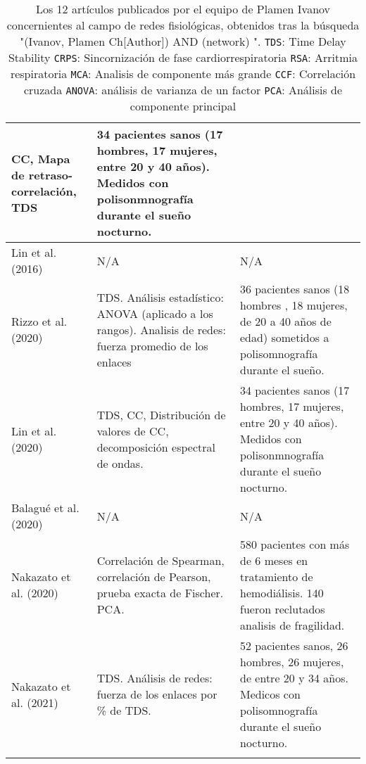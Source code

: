 \documentclass[twoside,twocolumn]{article}
\begin{document}
\begin{center}
\begin{longtable}{|p{}p{}p{}|}
    CC,
    Mapa de retraso-correlación, TDS
    &
    34 pacientes sanos (17 hombres, 17 mujeres, entre 20 y 40 años). Medidos con polisonmnografía durante el sueño nocturno.
    \\ \hline
    Lin et al. (2016)\cite{ivanov2016focus} &
    N/A
    &
    N/A
    \\ \hline
    Rizzo et al. (2020)\cite{rizzo2020network} &
    TDS.
    Análisis estadístico: ANOVA (aplicado a los rangos).
    Analisis de redes: fuerza promedio de los enlaces
    &
    36 pacientes sanos (18 hombres , 18 mujeres, de 20 a 40 años de edad) sometidos a polisomnografía durante el sueño.
    \\ \hline
    Lin et al. (2020)\cite{lin2020dynamic} &
    TDS, CC, Distribución de valores de CC, decomposición espectral de ondas.
    &
    34 pacientes sanos (17 hombres, 17 mujeres, entre 20 y 40 años). Medidos con polisonmnografía durante el sueño nocturno.
    \\ \hline
    Balagué et al. (2020)\cite{balague2020network} &
    N/A
    &
    N/A
    \\ \hline
    Nakazato et al. (2020)\cite{nakazato2020estimation} &
    Correlación de Spearman, correlación de Pearson, prueba exacta de Fischer.
    PCA.
    &
    580 pacientes con más de 6 meses en tratamiento de hemodiálisis. 140 fueron reclutados analisis de fragilidad.
    \\ \hline
    Nakazato et al. (2021)\cite{ivanov2021signal} &
    TDS.
    Análisis de redes: fuerza de los enlaces por \% de TDS.
    &
    52 pacientes sanos, 26 hombres, 26 mujeres, de entre 20 y 34 años. Medicos con polisomnografía durante el sueño nocturno.
    \\ \hline
    \caption{Los 12 artículos publicados por el equipo de Plamen Ivanov concernientes al campo de redes fisiológicas, obtenidos tras la búsqueda "(Ivanov, Plamen Ch[Author]) AND (network) ".
    \texttt{TDS}: Time Delay Stability
    \texttt{CRPS}: Sincornización de fase cardiorrespiratoria
    \texttt{RSA}: Arritmia respiratoria
    \texttt{MCA}: Analisis de componente más grande
    \texttt{CCF}: Correlación cruzada
    \texttt{ANOVA}: análisis de varianza de un factor
    \texttt{PCA}: Análisis de componente principal
    }
    \label{tab:plamenGroup}
  \end{longtable}
\end{center}
\end{document}
